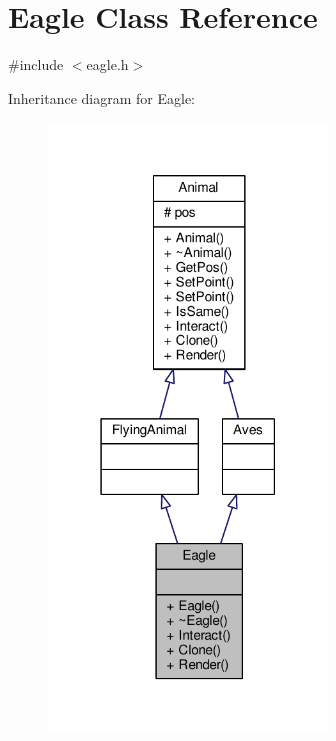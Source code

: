 \hypertarget{classEagle}{}\section{Eagle Class Reference}
\label{classEagle}


{\ttfamily \#include $<$eagle.\+h$>$}



Inheritance diagram for Eagle\+:
\nopagebreak
\begin{figure}[H]
\begin{center}
\leavevmode
\includegraphics[width=210pt]{classEagle__inherit__graph}
\end{center}
\end{figure}



